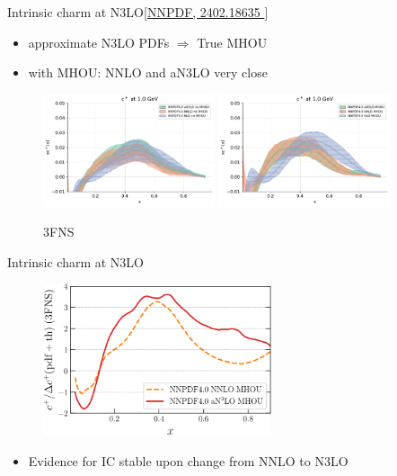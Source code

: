 \documentclass[aspectratio=43, 8pt,t]{beamer}
\begin{document}
\begin{frame}{Intrinsic charm at N3LO}{\color{gray}\footnotesize [\hyperlink{https://arxiv.org/abs/2402.18635 }{NNPDF, 2402.18635 }]}
  \begin{itemize}
    \item approximate N3LO PDFs $\Rightarrow$ True MHOU
    \item with MHOU: NNLO and aN3LO very close
  \end{itemize}

  \begin{figure}
    \includegraphics[width=0.45\textwidth]{n3lo_charm.pdf}
    \includegraphics[width=0.45\textwidth]{n3lo_charm_mhou.pdf}
    \caption*{3FNS}
  \end{figure}
\end{frame}

\begin{frame}{Intrinsic charm at N3LO}
  \begin{figure}
    \includegraphics[width=0.6\textwidth]{IC-Significance-N3LO.pdf}
  \end{figure}
  \begin{itemize}
    \item Evidence for IC stable upon change from NNLO to N3LO
  \end{itemize}
\end{frame}
\end{document}
